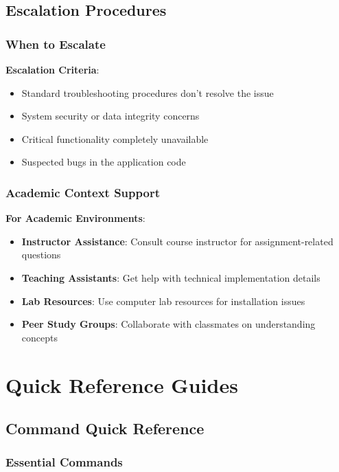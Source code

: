 \subsection{Escalation Procedures}

\subsubsection{When to Escalate}

\textbf{Escalation Criteria}:
\begin{itemize}
    \item Standard troubleshooting procedures don't resolve the issue
    \item System security or data integrity concerns
    \item Critical functionality completely unavailable
    \item Suspected bugs in the application code
\end{itemize}

\subsubsection{Academic Context Support}

\textbf{For Academic Environments}:
\begin{itemize}
    \item \textbf{Instructor Assistance}: Consult course instructor for assignment-related questions
    \item \textbf{Teaching Assistants}: Get help with technical implementation details
    \item \textbf{Lab Resources}: Use computer lab resources for installation issues
    \item \textbf{Peer Study Groups}: Collaborate with classmates on understanding concepts
\end{itemize}

\section{Quick Reference Guides}

\subsection{Command Quick Reference}

\subsubsection{Essential Commands}

